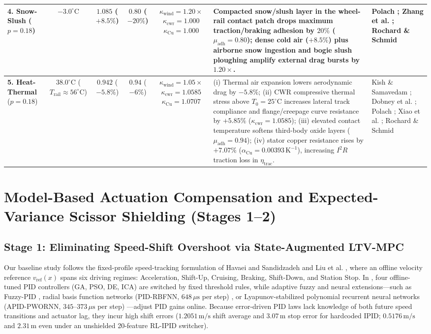 \documentclass[10pt,a4paper]{article}
\begin{document}
\begin{table}[h!]
{\begin{tabular}{p{1.9cm}ccccp{5.9cm}p{2.3cm}}
\midrule
\textbf{4. Snow-Slush} ($p = 0.18$) & $-3.0^\circ\text{C}$ & $1.085$ ($+8.5\%$) & $0.80$ ($-20\%$) & $\kappa_{\text{wind}}=1.20\times$ $\kappa_{\text{cwr}}=1.000$ $\kappa_{\text{Cu}}=1.000$ & Compacted snow/slush layer in the wheel-rail contact patch drops maximum traction/braking adhesion by $20\%$ ($\mu_{\text{adh}}=0.80$); dense cold air ($+8.5\%$) plus airborne snow ingestion and bogie slush ploughing amplify external drag bursts by $1.20\times$. & Polach \cite{ref24}; Zhang et al. \cite{ref25}; Rochard \& Schmid \cite{ref23} \\
\midrule
\textbf{5. Heat-Thermal} ($p = 0.18$) & $38.0^\circ\text{C}$ ($T_{\text{rail}}\approx 56^\circ\text{C}$) & $0.942$ ($-5.8\%$) & $0.94$ ($-6\%$) & $\kappa_{\text{wind}}=1.05\times$ $\kappa_{\text{cwr}}=1.0585$ $\kappa_{\text{Cu}}=1.0707$ & (i) Thermal air expansion lowers aerodynamic drag by $-5.8\%$; (ii) CWR compressive thermal stress above $T_0=25^\circ\text{C}$ increases lateral track compliance and flange/creepage curve resistance by $+5.85\%$ ($\kappa_{\text{cwr}}=1.0585$); (iii) elevated contact temperature softens third-body oxide layers ($\mu_{\text{adh}}=0.94$); (iv) stator copper resistance rises by $+7.07\%$ ($\alpha_{\text{Cu}}=0.00393\,\text{K}^{-1}$), increasing $I^2R$ traction loss in $\eta_{\text{trac}}$. & Kish \& Samavedam \cite{ref27}; Dobney et al. \cite{ref28}; Polach \cite{ref24}; Xiao et al. \cite{ref16}; Rochard \& Schmid \cite{ref23} \\
\bottomrule
\end{tabular}%
}
\end{table}

\section{Model-Based Actuation Compensation and Expected-Variance Scissor Shielding (Stages 1--2)}
\label{sec:stage1_2}

\subsection{Stage 1: Eliminating Speed-Shift Overshoot via State-Augmented LTV-MPC}
Our baseline study follows the fixed-profile speed-tracking formulation of Havaei and Sandidzadeh \cite{ref1} and Liu et al. \cite{ref2}, where an offline velocity reference $v_{\text{ref}}(x)$ spans six driving regimes: Acceleration, Shift-Up, Cruising, Braking, Shift-Down, and Station Stop. In \cite{ref1}, four offline-tuned PID controllers (GA, PSO, DE, ICA) are switched by fixed threshold rules, while adaptive fuzzy and neural extensions—such as Fuzzy-PID \cite{ref29}, radial basis function networks (PID-RBFNN, $648\,\mu\text{s}$ per step) \cite{ref20}, or Lyapunov-stabilized polynomial recurrent neural networks (APID-PWORNN, $345\text{--}373\,\mu\text{s}$ per step) \cite{ref19}—adjust PID gains online. Because error-driven PID laws lack knowledge of both future speed transitions and actuator lag, they incur high shift errors ($1.2051\,\text{m/s}$ shift average and $3.07\,\text{m}$ stop error for hardcoded IPID; $0.5176\,\text{m/s}$ and $2.31\,\text{m}$ even under an unshielded 20-feature RL-IPID switcher).
\end{document}
